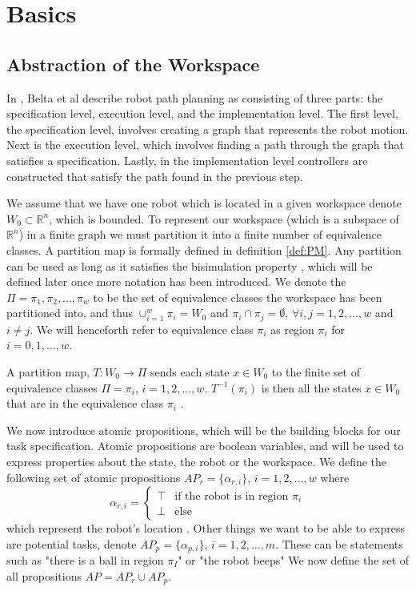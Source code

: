 \section{Basics}

\subsection{Abstraction of the Workspace}
In \cite{belta07}, Belta et al describe robot path planning as consisting of three parts: the specification level, execution level, and the implementation level. The first level, the specification level, involves creating a graph that represents the robot motion. Next is the execution level, which involves finding a path through the graph that satisfies a specification. Lastly, in the implementation level controllers are constructed that satisfy the path found in the previous step. 

We assume that we have one robot which is located in a given workspace denote $W_0 \subset \mathbb{R}^n$, which is bounded. To represent our workspace (which is a subspace of $\mathbb{R}^n$) in a finite graph we must partition it into a finite number of equivalence classes. A partition map is formally defined in definition \ref{def:PM}. Any partition can be used as long as it satisfies the bisimulation property \cite{belta04}, which will be defined later once more notation has been introduced. We denote the $\Pi = {\pi_1, \pi_2, \dots, \pi_w}$ to be the set of equivalence classes the workspace has been partitioned into, and thus $\cup_{i=1}^w \pi_i = W_0$ and $\pi_i \cap \pi_j = \emptyset$, $\forall i,j=1,2,\dots,w$ and $i\neq j$. We will henceforth refer to equivalence class $\pi_i$ as region $\pi_i$ for $i = 0,1,\dots, w$. 

\begin{definition}
\label{def:PM}
A partition map, $T: W_0 \rightarrow \Pi$ sends each state $x \in W_0$ to the finite set of equivalence classes $\Pi = {\pi_i}$,  $i = 1,2,\dots ,w$. $T^{-1}(\pi_i)$ is then all the states $x \in W_0$ that are in the equivalence class $\pi_i$ \cite{fainekos05}. 
\end{definition} 

We now introduce atomic propositions, which will be the building blocks for our task specification. Atomic propositions are boolean variables, and will be used to express properties about the state, the robot or the workspace. We define the following set of atomic propositions $AP_r = \{\alpha_{r,i}\}$, $i=1,2,\dots,w$ where 
\[\alpha_{r,i} =  \begin{cases}
\top & \text{if the robot is in region $\pi_i$} \\
\bot & \text{else}
\end{cases}
\]
which represent the robot's location \cite{guo15}. Other things we want to be able to express are potential tasks, denote $AP_p = \{\alpha_{p,i}\}$, $i=1,2,\dots,m$. These can be statements such as "there is a ball in region $\pi_I$" or "the robot beeps"
We now define the set of all propositions $AP = AP_r \cup AP_p$.

